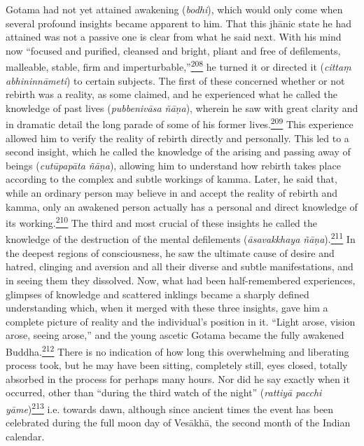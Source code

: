 Gotama had not yet attained awakening (\emph{bodhi}), which would only
come when several profound insights became apparent to him. That this
jhānic state he had attained was not a passive one is clear from what he
said next. With his mind now ``focused and purified, cleansed and
bright, pliant and free of defilements, malleable, stable, firm and
imperturbable,''\label{footprints_split_009.html_fnref208}\hyperref[footprints_split_024.htmlux5cux23fn208]{\textsuperscript{208}}
he turned it or directed it (\emph{cittaṃ abhininnāmeti}) to certain
subjects. The first of these concerned whether or not rebirth was a
reality, as some claimed, and he experienced what he called the
knowledge of past lives (\emph{pubbenivāsa ñāṇa}), wherein he saw with
great clarity and in dramatic detail the long parade of some of his
former
lives.\label{footprints_split_009.html_fnref209}\hyperref[footprints_split_024.htmlux5cux23fn209]{\textsuperscript{209}}
This experience allowed him to verify the reality of rebirth directly
and personally. This led to a second insight, which he called the
knowledge of the arising and passing away of beings (\emph{cutūpapāta
ñāṇa}), allowing him to understand how rebirth takes place according to
the complex and subtle workings of kamma. Later, he said that, while an
ordinary person may believe in and accept the reality of rebirth and
kamma, only an awakened person actually has a personal and direct
knowledge of its
working.\label{footprints_split_009.html_fnref210}\hyperref[footprints_split_024.htmlux5cux23fn210]{\textsuperscript{210}}
The third and most crucial of these insights he called the knowledge of
the destruction of the mental defilements (\emph{āsavakkhaya
ñāṇa}).\label{footprints_split_009.html_fnref211}\hyperref[footprints_split_024.htmlux5cux23fn211]{\textsuperscript{211}}
In the deepest regions of consciousness, he saw the ultimate cause of
desire and hatred, clinging and aversion and all their diverse and
subtle manifestations, and in seeing them they dissolved. Now, what had
been half-remembered experiences, glimpses of knowledge and scattered
inklings became a sharply defined understanding which, when it merged
with these three insights, gave him a complete picture of reality and
the individual's position in it. ``Light arose, vision arose, seeing
arose,'' and the young ascetic Gotama became the fully awakened
Buddha.\label{footprints_split_009.html_fnref212}\hyperref[footprints_split_024.htmlux5cux23fn212]{\textsuperscript{212}}
There is no indication of how long this overwhelming and liberating
process took, but he may have been sitting, completely still, eyes
closed, totally absorbed in the process for perhaps many hours. Nor did
he say exactly when it occurred, other than ``during the third watch of
the night'' (\emph{rattiyā pacchi
yāme})\label{footprints_split_009.html_fnref213}\hyperref[footprints_split_024.htmlux5cux23fn213]{\textsuperscript{213}}
i.e. towards dawn, although since ancient times the event has been
celebrated during the full moon day of Vesākhā, the second month of the
Indian calendar.

